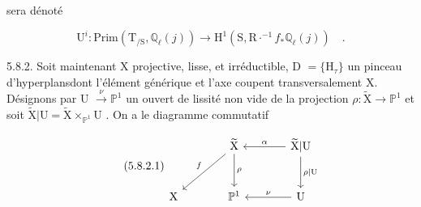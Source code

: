 sera dénoté

\begin{equation}\tag{5.8.1.6}
\mathrm{U}^i : \mathrm{Prim}(\mathrm{T}_{/\mathrm{S}},\mathbb{Q}_\ell(j)) \longrightarrow \mathrm{H}^1(\mathrm{S},\mathrm{R}\cdot^{-1}f_*\mathbb{Q}_\ell(j)) \quad .
\end{equation}

5.8.2. Soit maintenant X projective, lisse, et irréductible, D $= \{\mathrm{H}_\tau\}$ un pinceau d'hyperplansdont l'élément générique et l'axe coupent transversalement X. Désignons par U $\overset{\nu}{\longrightarrow} \mathbb{P}^1$ un ouvert de lissité non vide de la projection $\rho : \widetilde{\mathrm{X}} \longrightarrow \mathbb{P}^1$ et soit $\widetilde{\mathrm{X}}|\mathrm{U} = \widetilde{\mathrm{X}} \times_{\mathbb{P}^1} \mathrm{U}$ . On a le diagramme commutatif

\begin{equation}\tag{5.8.2.1}
\begin{tikzcd}[column sep=large, row sep=large]
{} & \widetilde{\mathrm{X}} \arrow[dl, "f"'] \arrow[d, "\rho"] & \widetilde{\mathrm{X}}|\mathrm{U} \arrow[l, "\alpha"'] \arrow[d, "\rho|\mathrm{U}"] \\
\mathrm{X} & \mathbb{P}^1 & \mathrm{U} \arrow[l, "\nu"']
\end{tikzcd}
\end{equation}




